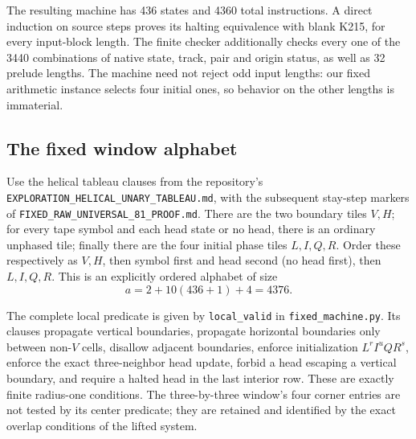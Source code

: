 The resulting machine has 436 states and 4360 total instructions. A
direct induction on source steps proves its halting equivalence with
blank K215, for every input-block length. The finite checker additionally
checks every one of the 3440 combinations of native state, track, pair
and origin status, as well as 32 prelude lengths. The machine need not
reject odd input lengths: our fixed arithmetic instance selects four
initial ones, so behavior on the other lengths is immaterial.

\subsection{The fixed window alphabet}

Use the helical tableau clauses from the repository's
\texttt{EXPLORATION\_HELICAL\_UNARY\_TABLEAU.md}, with the subsequent
stay-step markers of \texttt{FIXED\_RAW\_UNIVERSAL\_81\_PROOF.md}.
There are the two boundary tiles $V,H$; for every tape symbol and each
head state or no head, there is an ordinary unphased tile; finally there
are the four initial phase tiles $L,I,Q,R$. Order these respectively as
$V,H$, then symbol first and head second (no head first), then $L,I,Q,R$.
This is an explicitly ordered alphabet of size
\[
        a=2+10(436+1)+4=4376.
\]

The complete local predicate is given by \texttt{local\_valid} in
\texttt{fixed\_machine.py}. Its clauses propagate vertical boundaries,
propagate horizontal boundaries only between non-$V$ cells, disallow
adjacent boundaries, enforce initialization $L^rI^uQR^s$, enforce the
exact three-neighbor head update, forbid a head escaping a vertical
boundary, and require a halted head in the last interior row. These are
exactly finite radius-one conditions. The three-by-three window's four
corner entries are not tested by its center predicate; they are retained
and identified by the exact overlap conditions of the lifted system.

